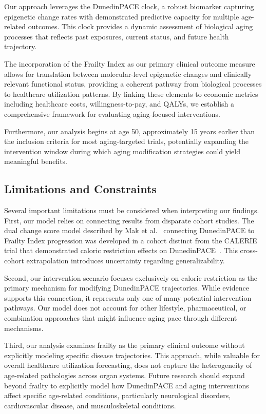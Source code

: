 Our approach leverages the DunedinPACE clock, a robust biomarker capturing epigenetic change rates with demonstrated predictive capacity for multiple age-related outcomes. This clock provides a dynamic assessment of biological aging processes that reflects past exposures, current status, and future health trajectory.

The incorporation of the Frailty Index as our primary clinical outcome measure allows for translation between molecular-level epigenetic changes and clinically relevant functional status, providing a coherent pathway from biological processes to healthcare utilization patterns. By linking these elements to economic metrics including healthcare costs, willingness-to-pay, and QALYs, we establish a comprehensive framework for evaluating aging-focused interventions.

Furthermore, our analysis begins at age 50, approximately 15 years earlier than the inclusion criteria for most aging-targeted trials, potentially expanding the intervention window during which aging modification strategies could yield meaningful benefits.

\subsection{Limitations and Constraints}

Several important limitations must be considered when interpreting our findings. First, our model relies on connecting results from disparate cohort studies. The dual change score model described by Mak et al.~\cite{Mak2023} connecting DunedinPACE to Frailty Index progression was developed in a cohort distinct from the CALERIE trial that demonstrated caloric restriction effects on DunedinPACE~\cite{Waziry2023}. This cross-cohort extrapolation introduces uncertainty regarding generalizability.

Second, our intervention scenario focuses exclusively on caloric restriction as the primary mechanism for modifying DunedinPACE trajectories. While evidence supports this connection, it represents only one of many potential intervention pathways. Our model does not account for other lifestyle, pharmaceutical, or combination approaches that might influence aging pace through different mechanisms.

Third, our analysis examines frailty as the primary clinical outcome without explicitly modeling specific disease trajectories. This approach, while valuable for overall healthcare utilization forecasting, does not capture the heterogeneity of age-related pathologies across organ systems. Future research should expand beyond frailty to explicitly model how DunedinPACE and aging interventions affect specific age-related conditions, particularly neurological disorders, cardiovascular disease, and musculoskeletal conditions.

